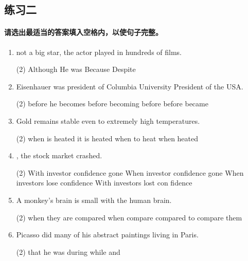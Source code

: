 \subsection{练习二}

\paragraph{请选出最适当的答案填入空格内，以使句子完整。}

\begin{enumerate}
\item \ttu not a big star, the actor played in hundreds of films.
\begin{tasks}(2)
  \task Although
  \task He was
  \task Because
  \task Despite
\end{tasks}

\item Eisenhauer was president of Columbia University \ttu President of the USA.
\begin{tasks}(2)
  \task before he becomes
  \task before becoming
  \task before
  \task before became
\end{tasks}

\item Gold remains stable even \ttu to extremely high temperatures.
\begin{tasks}(2)
  \task when is heated
  \task it is heated
  \task when to heat
  \task when heated
\end{tasks}

\item \ttu, the stock market crashed.
\begin{tasks}(2)
  \task With investor confidence gone
  \task When investor confidence gone
  \task When investors lose confidence
  \task With investors lost con fidence
\end{tasks}

\item A monkey's brain is small \ttu with the human brain.
\begin{tasks}(2)
  \task when they are compared
  \task when compare
  \task compared
  \task to compare them
\end{tasks}

\item Picasso did many of his abstract paintings \ttu living in Paris.
\begin{tasks}(2)
  \task that he was
  \task during
  \task while
  \task and
\end{tasks}


\end{enumerate}
